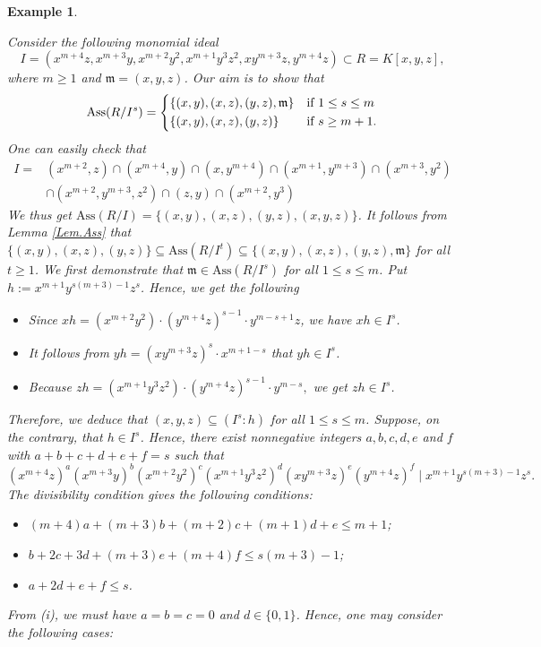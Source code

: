 \documentclass[11pt]{amsart}
\newtheorem{example}[theorem]{Example}
\begin{document}
  
\medskip
\begin{example}  \label{Ex.Ass.PandN.3}
\em{
Consider the following monomial ideal 
$$I=\left(x^{m+4}z,x^{m+3}y,x^{m+2}y^2,x^{m+1}y^3z^2,xy^{m+3}z,y^{m+4}z\right) \subset R=K[x,y,z],$$ 
where $m\geq 1$   and $\mathfrak{m}=(x,y,z)$.  Our aim is to show that 
\[
\mathrm{Ass}(R/I^s) =
    \begin{dcases}
    \{(x,y), (x,z), (y,z), \mathfrak{m}\} & \text{if } 1\leq s\leq m\\
\{(x,y), (x,z), (y,z)\}  & \text{if } s\geq m+1. \\
                 \end{dcases}
\]
One can easily check that 
\begin{align*}
I ={} & (x^{m+2}, z) \cap (x^{m+4}, y) \cap (x, y^{m+4}) \cap (x^{m+1}, y^{m+3}) \cap (x^{m+3}, y^2) \\
& \cap (x^{m+2}, y^{m+3}, z^2) \cap (z, y)  \cap (x^{m+2}, y^3)
\end{align*}
We thus get  $\mathrm{Ass}(R/I)=\{(x,y), (x,z), (y,z), (x,y,z)\}$. It follows from  Lemma \ref{Lem.Ass}  that 
 $ \{(x,y), (x,z), (y,z)\} \subseteq \mathrm{Ass}(R/I^t) \subseteq \{(x,y), (x,z), (y,z), \mathfrak{m}\}$ for all $t\geq 1$. 
  We first demonstrate that  $\mathfrak{m}\in \mathrm{Ass}(R/I^s)$ for all $1\leq s\leq m$. 
 Put  $h:=x^{m+1} y^{s(m+3)-1}z^s$. Hence, we get  the following 
\begin{itemize}
\item[$\bullet$] Since $xh = {(x^{m+2} y^2)} \cdot {(y^{m+4} z)^{s-1}} \cdot y^{m-s+1}z$, we have $xh \in I^s$.
\item[$\bullet$] It follows from $yh = (xy^{m+3}z)^s \cdot x^{m+1-s}$  that $yh\in I^s$.
\item[$\bullet$] Because $zh = {(x^{m+1} y^3 z^2)} \cdot {(y^{m+4} z)^{s-1}} \cdot y^{m-s},$ we get $zh\in I^s$. 
\end{itemize}
 Therefore, we deduce that    $(x,y,z) \subseteq (I^s:h)$ for all $1\leq s \leq m$. Suppose, on the contrary, that
 $h\in I^s$. Hence, there exist nonnegative integers $a,b,c,d,e$ and $f$ with $a + b + c + d + e+f = s$  such that
$$(x^{m+4}z)^a (x^{m+3}y)^b (x^{m+2}y^2)^c (x^{m+1}y^3z^2)^d (xy^{m+3}z)^e (y^{m+4}z)^f \mid x^{m+1} y^{s(m+3)-1}z^s.$$
The divisibility condition gives the following conditions:

\begin{itemize}
\item[(i)]  $(m+4)a + (m+3)b + (m+2)c + (m+1)d + e \le m+1$;
\item[(ii)]  $b + 2c + 3d + (m+3)e + (m+4)f \le s(m+3) - 1$;
\item[(iii)]   $a + 2d + e + f \le s$.
\end{itemize}
From  (i), we must have $a=b=c=0$ and $d\in \{0,1\}$. Hence, one may consider the following cases:

}
\end{example}
\end{document}

